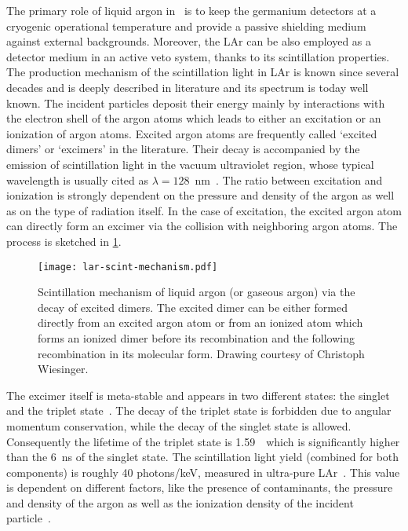 The primary role of liquid argon in \gerda\ is to keep the germanium detectors at a
cryogenic operational temperature and provide a passive shielding medium against external
backgrounds. Moreover, the LAr can be also employed as a detector medium in an active veto
system, thanks to its scintillation properties. The production mechanism of the
scintillation light in LAr is known since several decades and is deeply described in
literature and its spectrum is today well known. The incident particles deposit their
energy mainly by interactions with the electron shell of the argon atoms which leads to
either an excitation or an ionization of argon atoms. Excited argon atoms are frequently
called `excited dimers' or `excimers' in the literature. Their decay is accompanied by the
emission of scintillation light in the vacuum ultraviolet region, whose typical wavelength
is usually cited as $\lambda = 128$~nm~\cite{Heindl2010}. The ratio between excitation and
ionization is strongly dependent on the pressure and density of the argon as well as on
the type of radiation itself. In the case of excitation, the excited argon atom can
directly form an excimer via the collision with neighboring argon atoms. The process is
sketched in \cref{fig:setup:lar-scint}.
\begin{figure}
  \centering
  \texttt{[image: lar-scint-mechanism.pdf]}
  \caption{%
    Scintillation mechanism of liquid argon (or gaseous argon) via the decay of excited
    dimers. The excited dimer can be either formed directly from an excited argon atom or
    from an ionized atom which forms an ionized dimer before its recombination and the
    following recombination in its molecular form. Drawing courtesy of Christoph
    Wiesinger.
  }\label{fig:setup:lar-scint}
\end{figure}
The excimer itself is meta-stable and appears in two different states: the singlet and the
triplet state~\cite{Jortner1965, McCusker1984}.  The decay of the triplet state is
forbidden due to angular momentum conservation, while the decay of the singlet state is
allowed. Consequently the lifetime of the triplet state is 1.59~\mus\ which is
significantly higher than the 6~ns of the singlet state. The scintillation light yield
(combined for both components) is roughly 40 photons/keV, measured in ultra-pure
LAr~\cite{Doke1988}. This value is dependent on different factors, like the presence of
contaminants, the pressure and density of the argon as well as the ionization density of
the incident particle~\cite{Doke1988}.

